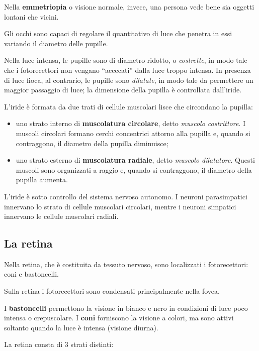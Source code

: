 \documentclass[]{article}
\begin{document}
Nella \textbf{emmetriopia} o visione normale, invece, una persona vede
bene sia oggetti lontani che vicini.

Gli occhi sono capaci di regolare il quantitativo di luce che penetra in
essi variando il diametro delle pupille.

Nella luce intensa, le pupille sono di diametro ridotto, o
\emph{costrette}, in modo tale che i fotorecettori non vengano
``accecati'' dalla luce troppo intensa. In presenza di luce fioca, al
contrario, le pupille sono \emph{dilatate}, in modo tale da permettere
un maggior passaggio di luce; la dimensione della pupilla è controllata
dall'iride.

L'iride è formata da due trati di cellule muscolari lisce che circondano
la pupilla:

\begin{itemize}
\itemsep1pt\parskip0pt
\item
  uno strato interno di \textbf{muscolatura circolare}, detto
  \emph{muscolo costrittore}. I muscoli circolari formano cerchi
  concentrici attorno alla pupilla e, quando si contraggono, il diametro
  della pupilla diminuisce;
\item
  uno strato esterno di \textbf{muscolatura radiale}, detto
  \emph{muscolo dilatatore}. Questi muscoli sono organizzati a raggio e,
  quando si contraggono, il diametro della pupilla aumenta.
\end{itemize}

L'iride è sotto controllo del sistema nervoso autonomo. I neuroni
parasimpatici innervano lo strato di cellule muscolari circolari, mentre
i neuroni simpatici innervano le cellule muscolari radiali.

\subsection{La retina}\label{la-retina}

Nella retina, che è costituita da tessuto nervoso, sono localizzati i
fotorecettori: coni e bastoncelli.

Sulla retina i fotorecettori sono condensati principalmente nella fovea.

I \textbf{bastoncelli} permettono la visione in bianco e nero in
condizioni di luce poco intensa o crepuscolare. I \textbf{coni}
forniscono la visione a colori, ma sono attivi soltanto quando la luce è
intensa (visione diurna).

La retina consta di 3 strati distinti:
\end{document}

